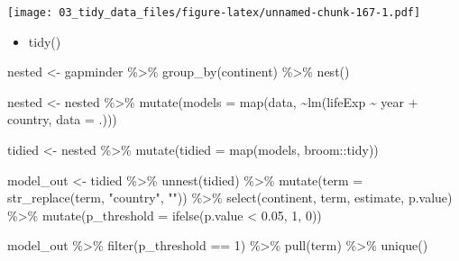 \documentclass[
]{book}
\newenvironment{Shaded}{\begin{snugshade}}{\end{snugshade}}
\newcommand{\AttributeTok}[1]{\textcolor[rgb]{0.77,0.63,0.00}{#1}}
\newcommand{\DecValTok}[1]{\textcolor[rgb]{0.00,0.00,0.81}{#1}}
\newcommand{\FloatTok}[1]{\textcolor[rgb]{0.00,0.00,0.81}{#1}}
\newcommand{\FunctionTok}[1]{\textcolor[rgb]{0.00,0.00,0.00}{#1}}
\newcommand{\NormalTok}[1]{#1}
\newcommand{\OtherTok}[1]{\textcolor[rgb]{0.56,0.35,0.01}{#1}}
\newcommand{\SpecialCharTok}[1]{\textcolor[rgb]{0.00,0.00,0.00}{#1}}
\newcommand{\StringTok}[1]{\textcolor[rgb]{0.31,0.60,0.02}{#1}}
\providecommand{\tightlist}{%
  \setlength{\itemsep}{0pt}\setlength{\parskip}{0pt}}
\begin{document}
\texttt{[image: 03\_tidy\_data\_files/figure-latex/unnamed-chunk-167-1.pdf]}

\begin{itemize}
\tightlist
\item
  tidy()
\end{itemize}

\begin{Shaded}
\begin{Highlighting}[]
\NormalTok{nested }\OtherTok{\textless{}{-}}\NormalTok{ gapminder }\SpecialCharTok{\%\textgreater{}\%}
  \FunctionTok{group\_by}\NormalTok{(continent) }\SpecialCharTok{\%\textgreater{}\%}
  \FunctionTok{nest}\NormalTok{()}

\NormalTok{nested }\OtherTok{\textless{}{-}}\NormalTok{ nested }\SpecialCharTok{\%\textgreater{}\%}
  \FunctionTok{mutate}\NormalTok{(}\AttributeTok{models =} \FunctionTok{map}\NormalTok{(data, }\SpecialCharTok{\textasciitilde{}}\FunctionTok{lm}\NormalTok{(lifeExp }\SpecialCharTok{\textasciitilde{}}\NormalTok{ year }\SpecialCharTok{+}\NormalTok{ country, }\AttributeTok{data =}\NormalTok{ .))) }

\NormalTok{tidied }\OtherTok{\textless{}{-}}\NormalTok{ nested }\SpecialCharTok{\%\textgreater{}\%}
  \FunctionTok{mutate}\NormalTok{(}\AttributeTok{tidied =} \FunctionTok{map}\NormalTok{(models, broom}\SpecialCharTok{::}\NormalTok{tidy))}

\NormalTok{model\_out }\OtherTok{\textless{}{-}}\NormalTok{ tidied }\SpecialCharTok{\%\textgreater{}\%}
  \FunctionTok{unnest}\NormalTok{(tidied) }\SpecialCharTok{\%\textgreater{}\%}
  \FunctionTok{mutate}\NormalTok{(}\AttributeTok{term =} \FunctionTok{str\_replace}\NormalTok{(term, }\StringTok{"country"}\NormalTok{, }\StringTok{""}\NormalTok{)) }\SpecialCharTok{\%\textgreater{}\%}
  \FunctionTok{select}\NormalTok{(continent, term, estimate, p.value) }\SpecialCharTok{\%\textgreater{}\%}
  \FunctionTok{mutate}\NormalTok{(}\AttributeTok{p\_threshold =} \FunctionTok{ifelse}\NormalTok{(p.value }\SpecialCharTok{\textless{}} \FloatTok{0.05}\NormalTok{, }\DecValTok{1}\NormalTok{, }\DecValTok{0}\NormalTok{))}

\NormalTok{model\_out }\SpecialCharTok{\%\textgreater{}\%} \FunctionTok{filter}\NormalTok{(p\_threshold }\SpecialCharTok{==} \DecValTok{1}\NormalTok{) }\SpecialCharTok{\%\textgreater{}\%} \FunctionTok{pull}\NormalTok{(term) }\SpecialCharTok{\%\textgreater{}\%} \FunctionTok{unique}\NormalTok{()}
\end{Highlighting}
\end{Shaded}
\end{document}

